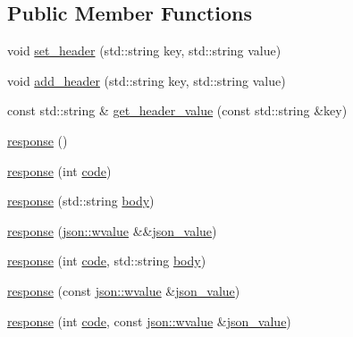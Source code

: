 \subsection*{Public Member Functions}
\begin{DoxyCompactItemize}
\item 
void \hyperlink{structcrow_1_1response_ab2b9a9b9795fa6330bd47b66a716cb0b}{set\-\_\-header} (std\-::string key, std\-::string value)
\item 
void \hyperlink{structcrow_1_1response_a16d1a8bcec6460ba97f90b80881693b8}{add\-\_\-header} (std\-::string key, std\-::string value)
\item 
const std\-::string \& \hyperlink{structcrow_1_1response_a8c35e92bc75eaa35f45e0ca6d22a8f47}{get\-\_\-header\-\_\-value} (const std\-::string \&key)
\item 
\hyperlink{structcrow_1_1response_a0f4955bc5dc914d698cff5e83bca1cdb}{response} ()
\item 
\hyperlink{structcrow_1_1response_a52e2658b1d16dcf106ed138b6396696b}{response} (int \hyperlink{structcrow_1_1response_aabc1f9b3264b8c5a2d05dcb409e8ff3f}{code})
\item 
\hyperlink{structcrow_1_1response_aab7485cb8f0efa3fcf062118476edfd5}{response} (std\-::string \hyperlink{structcrow_1_1response_ae9f3cc153eac05954f1f4e599527892d}{body})
\item 
\hyperlink{structcrow_1_1response_af43a564baff74506327cdd0bdb4671a2}{response} (\hyperlink{classcrow_1_1json_1_1wvalue}{json\-::wvalue} \&\&\hyperlink{structcrow_1_1response_ad21c0b65173426d51eca46ef4d3f1106}{json\-\_\-value})
\item 
\hyperlink{structcrow_1_1response_aeee8e7dd021783524bae9bd8775bae0f}{response} (int \hyperlink{structcrow_1_1response_aabc1f9b3264b8c5a2d05dcb409e8ff3f}{code}, std\-::string \hyperlink{structcrow_1_1response_ae9f3cc153eac05954f1f4e599527892d}{body})
\item 
\hyperlink{structcrow_1_1response_a2540c242bb7c7b4c94461c2fde641ef2}{response} (const \hyperlink{classcrow_1_1json_1_1wvalue}{json\-::wvalue} \&\hyperlink{structcrow_1_1response_ad21c0b65173426d51eca46ef4d3f1106}{json\-\_\-value})
\item 
\hyperlink{structcrow_1_1response_aec73bddf07318e59394d58c1e13cc4af}{response} (int \hyperlink{structcrow_1_1response_aabc1f9b3264b8c5a2d05dcb409e8ff3f}{code}, const \hyperlink{classcrow_1_1json_1_1wvalue}{json\-::wvalue} \&\hyperlink{structcrow_1_1response_ad21c0b65173426d51eca46ef4d3f1106}{json\-\_\-value})
\item 

\end{DoxyCompactItemize}
